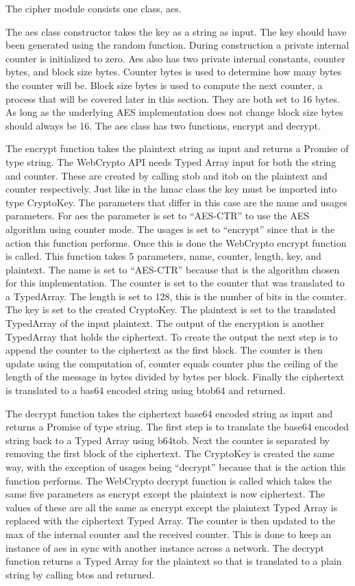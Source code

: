 The cipher module consists one class, aes.


The aes class constructor takes the key as a string as input. The key should have been generated using the random function. During construction a private internal counter is initialized to zero. Aes also has two private internal constants, counter bytes, and block size bytes. Counter bytes is used to determine how many bytes the counter will be. Block size bytes is used to compute the next counter, a process that will be covered later in this section. They are both set to 16 bytes. As long as the underlying AES implementation does not change block size bytes should always be 16. The aes class has two functions, encrypt and decrypt.


The encrypt function takes the plaintext string as input and returns a Promise of type string. The WebCrypto API needs Typed Array input for both the string and counter. These are created by calling stob and itob on the plaintext and counter respectively. Just like in the hmac class the key must be imported into type CryptoKey. The parameters that differ in this case are the name and usages parameters. For aes the parameter is set to “AES-CTR” to use the AES algorithm using counter mode. The usages is set to “encrypt” since that is the action this function performs. Once this is done the WebCrypto encrypt function is called. This function takes 5 parameters, name, counter, length, key, and plaintext. The name is set to “AES-CTR” because that is the algorithm chosen for this implementation. The counter is set to the counter that was translated to a TypedArray. The length is set to 128, this is the number of bits in the counter. The key is set to the created CryptoKey. The plaintext is set to the translated TypedArray of the input plaintext. The output of the encryption is another TypedArray that holds the ciphertext. To create the output the next step is to append the counter to the ciphertext as the first block. The counter is then update using the computation of, counter equals counter plus the ceiling of the length of the message in bytes divided by bytes per block. Finally the ciphertext is translated to a bas64 encoded string using btob64 and returned.


The decrypt function takes the ciphertext base64 encoded string as input and returns a Promise of type string. The first step is to translate the base64 encoded string back to a Typed Array using b64tob. Next the counter is separated by removing the first block of the ciphertext. The CryptoKey is created the same way, with the exception of usages being “decrypt” because that is the action this function performs. The WebCrypto decrypt function is called which takes the same five parameters as encrypt except the plaintext is now ciphertext. The values of these are all the same as encrypt except the plaintext Typed Array is replaced with the ciphertext Typed Array. The counter is then updated to the max of the internal counter and the received counter. This is done to keep an instance of aes in sync with another instance across a network. The decrypt function returns a Typed Array for the plaintext so that is translated to a plain string by calling btos and returned.


